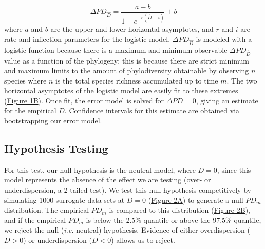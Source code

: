 \documentclass{article}
\begin{document}
\begin{equation}
	\label{sec:equation2}
	\Delta PD_{\hat{D}} = \frac {a-b} { 1 + e^{-r(\hat{D} -i)} } + b 
\end{equation}
where \(a\) and \(b\) are the upper and lower horizontal asymptotes, and \(r\) and \(i\) are rate and inflection parameters for the logistic model. \(\Delta PD_{\hat{D}}\) is modeled with a logistic function because there is a maximum and minimum observable \(\Delta PD_{\hat{D}}\) value as a function of the phylogeny; this is because there are strict minimum and maximum limits to the amount of phylodiversity obtainable by observing \(n\) species where \(n\) is the total species richness accumulated up to time \(m\). The two horizontal asymptotes of the logistic model are easily fit to these extremes (\hyperref[sec:figure1]{Figure 1B}). Once fit, the error model is solved for \(\Delta PD=0\), giving an estimate for the empirical \(D\). Confidence intervals for this estimate are obtained via bootstrapping our error model.

\subsection{Hypothesis Testing} \label{sec:hypothesisTesting}
For this test, our null hypothesis is the neutral model, where \(D = 0\), since this model represents the absence of the effect we are testing (over- or underdispersion, a 2-tailed test). We test this null hypothesis competitively by simulating 1000 surrogate data sets at \(D = 0\) (\hyperref[sec:figure2]{Figure 2A}) to generate a null \(PD_m\) distribution. The empirical \(PD_m\) is compared to this distribution (\hyperref[sec:figure2]{Figure 2B}), and if the empirical \(PD_m\) is below the 2.5\% quantile or above the 97.5\% quantile, we reject the null (\emph{i.e.} neutral) hypothesis. Evidence of either overdispersion (\(D > 0\)) or underdispersion (\(D < 0\)) allows us to reject.
\end{document}
